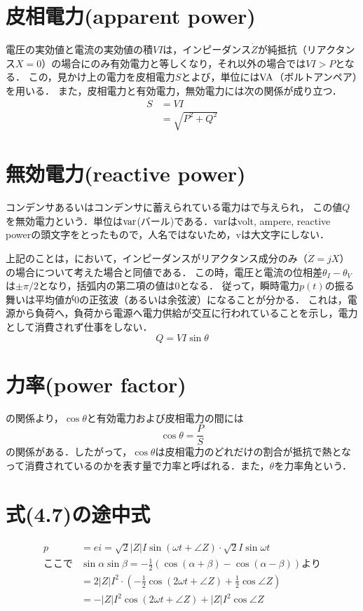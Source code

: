 \documentclass[11pt,dvipdfmx]{ujarticle}
\begin{document}
\section{皮相電力(apparent power)\cite{11300007922816}}
電圧の実効値と電流の実効値の積$VI$は，インピーダンス$\dot{Z}$が純抵抗（リアクタンス$X=0$）の場合にのみ有効電力と等しくなり，それ以外の場合では$VI> P$となる．
この，見かけ上の電力を皮相電力$S$とよび，単位には$\rm{VA}$（ボルトアンペア）を用いる．
また，皮相電力と有効電力，無効電力には次の関係が成り立つ．
\begin{align}
	S &= VI\nonumber\\
	&= \sqrt{P^2+Q^2}
\end{align}


\section{無効電力(reactive power)\cite{11300007922816}}
コンデンサあるいはコンデンサに蓄えられている電力はで与えられ，
この値$Q$を無効電力という．単位は$\rm{var}$(バール)である．$\rm{var}$はvolt, ampere, reactive powerの頭文字をとったもので，人名ではないため，vは大文字にしない．

上記のことは，において，インピーダンスがリアクタンス成分のみ（$\dot{Z}=jX$）の場合について考えた場合と同値である．
この時，電圧と電流の位相差$\theta_I-\theta_V$は$\pm\pi/2$となり，括弧内の第二項の値は0となる．
従って，瞬時電力$p(t)$の振る舞いは平均値が0の正弦波（あるいは余弦波）になることが分かる．
これは，電源から負荷へ，負荷から電源へ電力供給が交互に行われていることを示し，電力として消費されず仕事をしない．
\begin{equation}
	Q = VI \sin \theta
	\label{eq:mukoh}
\end{equation}


\section{力率(power factor)\cite{11300007922816}}
の関係より，$\cos \theta$と有効電力および皮相電力の間には
\begin{equation}
	\cos \theta =\frac{P}{S}
\end{equation}
の関係がある．したがって，$\cos \theta$は皮相電力のどれだけの割合が抵抗で熱となって消費されているのかを表す量で力率と呼ばれる．また，$\theta$を力率角という．

\section{式(4.7)の途中式}
\begin{align*}
	p&=ei=\sqrt{2}|Z|I\sin (\omega t+ \angle Z)  \cdot \sqrt{2}I\sin \omega t\\
	ここで&\sin \alpha \sin \beta=-\frac{1}{2}\left(\cos (\alpha +\beta)-\cos (\alpha -\beta)\right)より\\
	&=2|Z|I^{2}\cdot \left(-\frac{1}{2}\cos (2\omega t +\angle Z)+\frac{1}{2}\cos \angle Z\right)\\
	&=-|Z|I^{2}\cos (2\omega t+\angle Z)+|Z|I^{2}\cos \angle Z
\end{align*}
\end{document}

